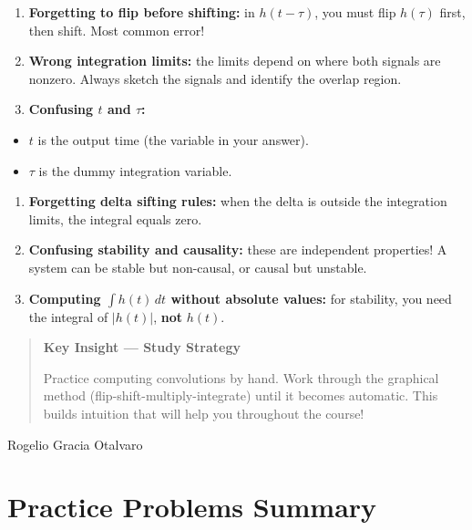 \documentclass[11pt]{article}
\begin{document}
\begin{enumerate}
  \item \textbf{Forgetting to flip before shifting:} in $h(t-\tau)$, you must flip $h(\tau)$ first, then shift. Most common error!
  \item \textbf{Wrong integration limits:} the limits depend on where both signals are nonzero. Always sketch the signals and identify the overlap region.
  \item \textbf{Confusing $t$ and $\tau$:}
\end{enumerate}
\begin{itemize}
  \item $t$ is the output time (the variable in your answer).
  \item $\tau$ is the dummy integration variable.
\end{itemize}
\begin{enumerate}
  \item \textbf{Forgetting delta sifting rules:} when the delta is outside the integration limits, the integral equals zero.
  \item \textbf{Confusing stability and causality:} these are independent properties! A system can be stable but non-causal, or causal but unstable.
  \item \textbf{Computing $\int h(t)\,dt$ without absolute values:} for stability, you need the integral of $|h(t)|$, \textbf{not} $h(t)$.
\end{enumerate}

\begin{quote}
\textbf{Key Insight — Study Strategy}

Practice computing convolutions by hand. Work through the graphical method (flip-shift-multiply-integrate) until it becomes automatic. This builds intuition that will help you throughout the course!
\end{quote}

Rogelio Gracia Otalvaro

\section*{Practice Problems Summary}
\end{document}
